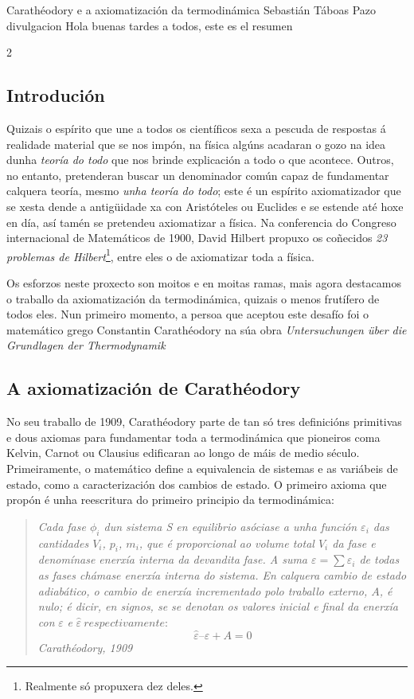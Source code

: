 \titular%
{Carathéodory e a axiomatización da termodinámica}
{Sebastián Táboas Pazo}
{divulgacion}
{Hola buenas tardes a todos, este es el resumen}

\begin{refsection}
\begin{multicols}{2}

\subsection*{Introdución}

Quizais o espírito que une a todos os científicos sexa a pescuda de respostas á
realidade material que se nos impón, na física algúns acadaran o gozo na idea
dunha \textit{teoría do todo} que nos brinde explicación a todo o que acontece.
Outros, no entanto, pretenderan buscar un denominador común capaz de
fundamentar calquera teoría, mesmo \textit{unha teoría do todo}; este é un
espírito axiomatizador que se xesta dende a antigüidade xa con Aristóteles ou
Euclides e se estende até hoxe en día, así tamén se pretendeu axiomatizar a
física. Na conferencia do Congreso internacional de Matemáticos de 1900, David
Hilbert propuxo os coñecidos \textit{23 problemas de
Hilbert}\footnote{Realmente só propuxera dez deles.}, entre eles o de
axiomatizar toda a física.

Os esforzos neste proxecto son moitos e en moitas ramas, mais agora destacamos
o traballo da axiomatización da termodinámica, quizais o menos frutífero de
todos eles. Nun primeiro momento, a persoa que aceptou este desafío foi o
matemático grego Constantin Carathéodory na súa obra \textit{Untersuchungen
über die Grundlagen der Thermodynamik}

\subsection*{A axiomatización de Carathéodory}

No seu traballo de 1909, Carathéodory parte de tan só tres definicións
primitivas e dous axiomas para fundamentar toda a termodinámica que pioneiros
coma Kelvin, Carnot ou Clausius edificaran ao longo de máis de medio século.
Primeiramente, o matemático define a equivalencia de sistemas e as variábeis de
estado, como a caracterización dos cambios de estado. O primeiro axioma que
propón é unha reescritura do primeiro principio da termodinámica:

\begin{quotation}
\textit{Cada fase $\phi_i$ dun sistema S en equilibrio asóciase a unha función
$\varepsilon_i$ das cantidades $V_i$, $p_i$, $m_i$, que é proporcional ao
volume total $V_i$ da fase e denomínase enerxía interna da devandita fase. A
suma $\varepsilon = \sum\varepsilon_i$ de todas as fases chámase enerxía
interna do sistema. En calquera cambio de estado adiabático, o cambio de
enerxía incrementado polo traballo externo, $A$, é nulo; é dicir, en signos, se
se denotan os valores inicial e final da enerxía con} $\varepsilon$ \textit{e}
$\hat{\varepsilon} ~\textit{respectivamente}$:  $$\hat{\varepsilon}
–\varepsilon + A = 0$$ \hspace{1cm}\textit{Carathéodory, 1909}
\end{quotation}


\end{multicols}
\end{refsection}
